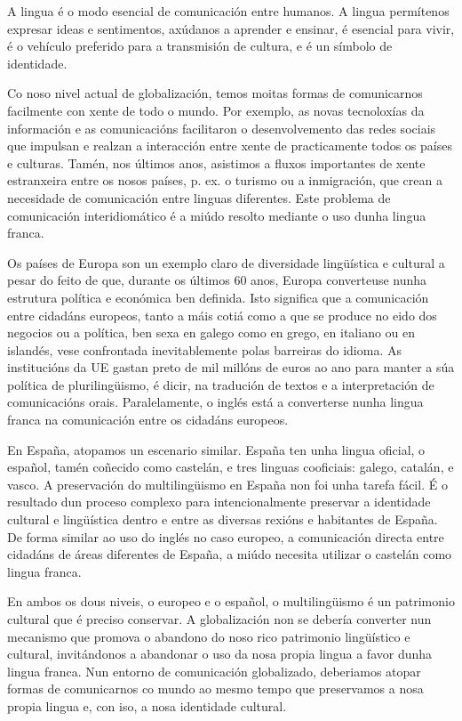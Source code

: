 \begin{multicols}{2}

A lingua é o modo esencial de comunicación entre humanos. A lingua permítenos expresar ideas e sentimentos, axúdanos a aprender e ensinar, é esencial para vivir, é o vehículo preferido para a transmisión de cultura, e é un símbolo de identidade.

Co noso nivel actual de globalización, temos moitas formas de comunicarnos facilmente con xente de todo o mundo. Por exemplo, as novas tecnoloxías da información e as comunicacións facilitaron o desenvolvemento das redes sociais que impulsan e realzan a interacción entre xente de practicamente todos os países e culturas. Tamén, nos últimos anos, asistimos a fluxos importantes de xente estranxeira entre os nosos países, p. ex. o turismo ou a inmigración, que crean a necesidade de comunicación entre linguas diferentes. Este problema de comunicación interidiomático  é a miúdo resolto mediante o uso dunha lingua franca.

Os países de Europa son un exemplo claro de diversidade lingüística e cultural a pesar do feito de que, durante os últimos 60 anos, Europa converteuse nunha estrutura política e económica ben definida. Isto significa que a comunicación entre cidadáns europeos, tanto a máis cotiá como a que se produce no eido dos negocios ou a política, ben sexa en galego como en grego, en italiano ou en islandés, vese confrontada inevitablemente polas barreiras do idioma. As institucións da UE gastan preto de mil millóns de euros ao ano para manter a súa política de plurilingüismo, é dicir, na tradución de textos e a interpretación de comunicacións orais. Paralelamente, o inglés está a converterse nunha lingua franca na comunicación entre os cidadáns europeos.

En España, atopamos un escenario similar. España ten unha lingua oficial, o español, tamén coñecido como castelán, e tres linguas cooficiais: galego, catalán, e vasco. A preservación do multilingüismo en España non foi unha tarefa fácil. É o resultado dun proceso complexo para intencionalmente preservar a identidade cultural e lingüística dentro e entre as diversas rexións e habitantes de España. De forma similar ao uso do inglés no caso europeo, a comunicación directa entre cidadáns de áreas  diferentes de España, a miúdo necesita utilizar o castelán como lingua franca.


En ambos os dous niveis, o europeo e o español, o multilingüismo é un patrimonio cultural que é preciso conservar. A globalización non se debería converter nun mecanismo que promova o abandono do noso rico patrimonio lingüístico e cultural, invitándonos a abandonar o uso da nosa propia lingua a favor dunha lingua franca. Nun entorno de comunicación globalizado, deberiamos atopar formas de comunicarnos co mundo ao mesmo tempo que preservamos a nosa propia lingua e, con iso, a nosa identidade cultural.


\end{multicols}
